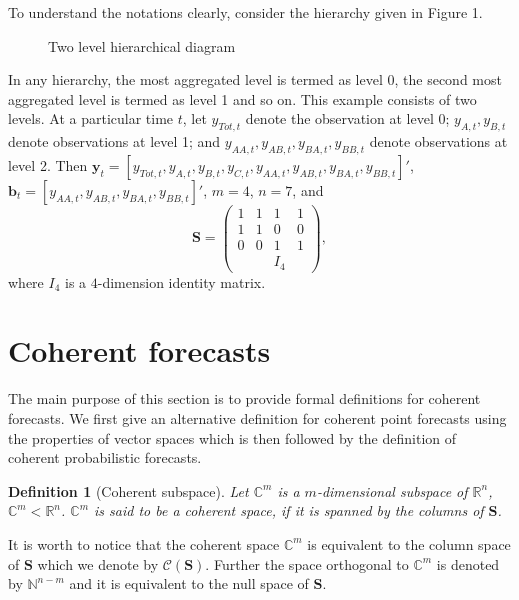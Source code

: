 \documentclass[a4paper, 11pt]{article}
\newtheorem{definition}{Definition}[section]
\begin{document}
	\noindent 
	To understand the notations clearly, consider the hierarchy given in Figure 1.
	\begin{figure}[H]
		\begin{center}
			  
			 
			\qobitree
		\end{center}
		\caption{Two level hierarchical diagram}
	\end{figure}
	\noindent
	In any hierarchy, the most aggregated level is termed as level 0, the second most aggregated level is termed as level 1 and so on. This example consists of two levels. At a particular time $t$, let $y_{Tot,t}$ denote the observation at level 0; $y_{A,t}, y_{B,t} $ denote observations at level 1; and $y_{AA,t}, y_{AB,t}, y_{BA,t}, y_{BB,t}$ denote observations at level 2. Then $\mathbold{y}_t = [y_{Tot,t},y_{A,t}, y_{B,t},y_{C,t},y_{AA,t}, y_{AB,t}, y_{BA,t}, y_{BB,t}]'$, \\$\mathbold{b}_t = [y_{AA,t}, y_{AB,t}, y_{BA,t}, y_{BB,t}]'$, $m=4$, $n=7$, and $$ \mathbold{S} = \begin{pmatrix} 1& 1 &1 &1  \\ 1 &1 & 0 &0 \\   0&0  & 1 & 1 \\ & & I_4 &   \end{pmatrix}, $$ where $I_4$ is a $4$-dimension identity matrix.  
	
	\section{Coherent forecasts}\label{sec:definitions}
	
	The main purpose of this section is to provide formal definitions for coherent forecasts. We first give an alternative definition for coherent point forecasts using the properties of vector spaces which is then followed by the definition of coherent probabilistic forecasts. 
	
	\begin{definition}[Coherent subspace]
		Let $\bm{\mathbb{C}}^m$ is a $m$-dimensional subspace of $\bm{\mathbb{R}}^n$, $\bm{\mathbb{C}}^m < \bm{\mathbb{R}}^n$. $\bm{\mathbb{C}}^m$ is said to be a coherent space, if it is spanned by the columns of $\bm{S}$. 
	\end{definition}
	
	It is worth to notice that the coherent space $\bm{\mathbb{C}}^m$ is equivalent to the column space of $\bm{S}$ which we denote by $\mathscr{C}(\bm{S})$. Further the space orthogonal to $\bm{\mathbb{C}}^m$ is denoted by $\bm{\mathbb{N}}^{n-m}$ and it is equivalent to the null space of $\bm{S}$.
	
\end{document}
